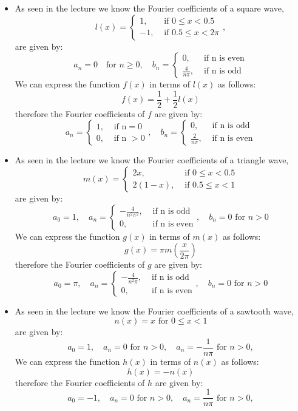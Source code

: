 \documentclass[11pt]{article}
\begin{document}
\begin{solution}     
    \begin{itemize}
    \item As seen in the lecture we know the Fourier coefficients of a square wave,
    \[
        l(x)= \begin{cases}1, & \text { if } 0 \leq x<0.5 \\ -1, & \text { if } 0.5 \leq x<2 \pi\end{cases},
    \]
    are given by:
    \[
        a_n = 0\quad \text{for } n \geq 0, \quad b_n = \begin{cases}0, & \text { if n is even} \\ \frac{4}{n\pi}, & \text{ if n is odd}\end{cases}
    \]
    We can express the function $f(x)$ in terms of $l(x)$ as follows:
    \[
        f(x) = \frac{1}{2} + \frac{1}{2}l(x)
    \]
    therefore the Fourier coefficients of $f$ are given by:
    \[
        a_n = \begin{cases} 1, & \text { if n} = 0 \\0,& \text{ if n }>0\end{cases}, \quad b_n = \begin{cases}0, & \text { if n is odd} \\ \frac{2}{n\pi}, & \text{ if n is even}\end{cases}
    \]
    \item  As seen in the lecture we know the Fourier coefficients of a triangle wave,
    \[
        m(x)= \begin{cases} 2 x, & \text { if } 0 \leq x<0.5 \\ 2(1-x), & \text { if } 0.5 \leq x<1\end{cases}
    \]
    are given by:
    \[
        a_0 = 1, \quad a_n = \begin{cases}-\frac{4}{n^2\pi^2}, & \text { if n is odd} \\ 0, & \text{ if n is even}\end{cases}, \quad b_n = 0 \text{ for } n > 0
    \]
    We can express the function $g(x)$ in terms of $m(x)$ as follows:
    \[
        g(x) = \pi m(\frac{x}{2\pi})
    \]
    therefore the Fourier coefficients of $g$ are given by:
    \[
        a_0 = \pi, \quad a_n = \begin{cases}-\frac{4}{n^2\pi}, & \text { if n is odd} \\ 0, & \text{ if n is even}\end{cases}, \quad b_n = 0 \text{ for } n > 0
    \]
    \item As seen in the lecture we know the Fourier coefficients of a sawtooth wave,
    \[
        n(x)=x \text { for } 0 \leq x<1
    \]
    are given by:   
    \[
        a_0 = 1, \quad a_n = 0 \text{ for } n > 0,  \quad a_n = -\frac{1}{n\pi} \text{ for } n > 0,
    \]
    We can express the function $h(x)$ in terms of $n(x)$ as follows:
    \[
        h(x) = -n(x)
    \]
    therefore the Fourier coefficients of $h$ are given by:
    \[
        a_0 = -1, \quad a_n = 0 \text{ for } n > 0,  \quad a_n = \frac{1}{n\pi} \text{ for } n > 0,
    \]
    \end{itemize}
\end{solution}
\end{document}
